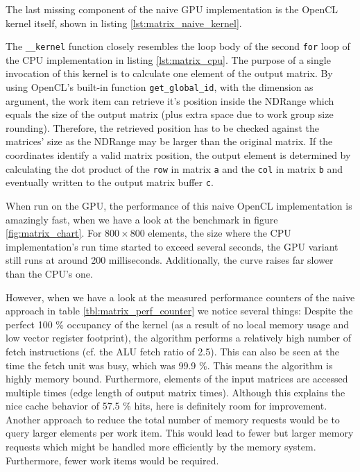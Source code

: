 The last missing component of the naive GPU implementation is the OpenCL kernel itself, shown in listing \ref{lst:matrix_naive_kernel}.



The \lstinline!__kernel! function closely resembles the loop body of the second \lstinline!for! loop of the CPU implementation in listing \ref{lst:matrix_cpu}. The purpose of a single invocation of this kernel is to calculate one element of the output matrix. By using OpenCL's built-in function \lstinline!get_global_id!, with the dimension as argument, the work item can retrieve it's position inside the NDRange which equals the size of the output matrix (plus extra space due to work group size rounding). Therefore, the retrieved position has to be checked against the matrices' size as the NDRange may be larger than the original matrix. If the coordinates identify a valid matrix position, the output element is determined by calculating the dot product of the \lstinline!row! in matrix \lstinline!a! and the \lstinline!col! in matrix \lstinline!b! and eventually written to the output matrix buffer \lstinline!c!.

When run on the GPU, the performance of this naive OpenCL implementation is amazingly fast, when we have a look at the benchmark in figure \ref{fig:matrix_chart}. For $800 \times 800$ elements, the size where the CPU implementation's run time started to exceed several seconds, the GPU variant still runs at around 200 milliseconds. Additionally, the curve raises far slower than the CPU's one.

However, when we have a look at the measured performance counters of the naive approach in table \ref{tbl:matrix_perf_counter} we notice several things: Despite the perfect 100 \% occupancy of the kernel (as a result of no local memory usage and low vector register footprint), the algorithm performs a relatively high number of fetch instructions (cf. the ALU fetch ratio of 2.5). This can also be seen at the time the fetch unit was busy, which was 99.9 \%. This means the algorithm is highly memory bound. Furthermore, elements of the input matrices are accessed multiple times (edge length of output matrix times). Although this explains the nice cache behavior of 57.5 \% hits, here is definitely room for improvement.
Another approach to reduce the total number of memory requests would be to query larger elements per work item. This would lead to fewer but larger memory requests which might be handled more efficiently by the memory system. Furthermore, fewer work items would be required.


